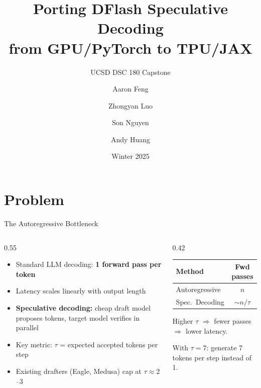 \documentclass[10pt]{beamer}
\title{Porting DFlash Speculative Decoding\\from GPU/PyTorch to TPU/JAX}
\subtitle{UCSD DSC 180 Capstone}
\date{Winter 2025}
\author{Aaron Feng \and Zhongyan Luo \and Son Nguyen \and Andy Huang}
\institute{Mentor: Hao Zhang \quad TA: Yiming Zhao}
\begin{document}
\maketitle

\section{Problem}

\begin{frame}{The Autoregressive Bottleneck}
\begin{columns}[T]
\begin{column}{0.55\textwidth}
\begin{itemize}
  \item Standard LLM decoding: \textbf{1 forward pass per token}
  \item Latency scales linearly with output length
  \item \textbf{Speculative decoding:} cheap draft model proposes tokens, target model verifies in parallel
  \item Key metric: \textbf{$\tau$} = expected accepted tokens per step
  \item Existing drafters (Eagle, Medusa) cap at $\tau \approx 2$--$3$
\end{itemize}
\end{column}
\begin{column}{0.42\textwidth}
\vspace{1em}
\centering
\footnotesize
\begin{tabular}{lc}
\toprule
\textbf{Method} & \textbf{Fwd passes} \\
\midrule
Autoregressive & $n$ \\
Spec.\ Decoding & $\sim n / \tau$ \\
\bottomrule
\end{tabular}

\vspace{1em}
\footnotesize
Higher $\tau$ $\Rightarrow$ fewer passes $\Rightarrow$ lower latency.

\vspace{0.5em}
With $\tau = 7$: generate 7 tokens per step instead of 1.
\end{column}
\end{columns}
\end{frame}
\end{document}
